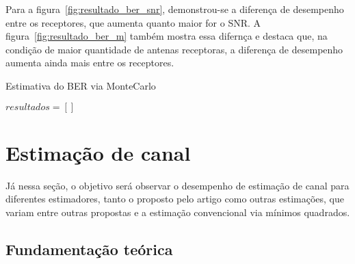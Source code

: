 \documentclass{article}
\begin{document}
Para a figura~\ref{fig:resultado_ber_snr}, demonstrou-se a diferença de desempenho entre os receptores, que aumenta quanto maior for o SNR. A figura~\ref{fig:resultado_ber_m} também mostra essa difernça e destaca que, na condição de maior quantidade de antenas receptoras, a diferença de desempenho aumenta ainda mais entre os receptores.

\begin{algorithm}
    \label{alg:ber_snr}
    \caption{Estimativa do BER via MonteCarlo}
    $resultados = []$
\end{algorithm}


\section{Estimação de canal}
\label{sec:estimacao_canal}

Já nessa seção, o objetivo será observar o desempenho de estimação de canal para diferentes estimadores, tanto o proposto pelo artigo como outras estimações, que variam entre outras propostas e a estimação convencional via mínimos quadrados. 

\subsection{Fundamentação teórica}
\end{document}
